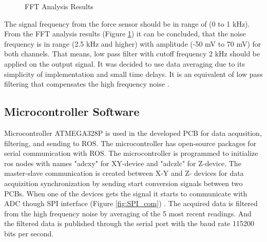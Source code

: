 \begin{figure}[h]%
\centering
{}%
\qquad
{}%
\caption{FFT Analysis Results}
\label{fig:FFT_res}
\end{figure}
	
	The signal frequency from the force sensor should be in range of (0 to 1 kHz). From the FFT analysis results (Figure \ref{fig:FFT_res}) it can be concluded, that the noise frequency is in range (2.5 kHz and higher) with amplitude (-50 mV to 70 mV) for both channels. That means, low pass filter with cutoff frequency 2 kHz should be applied on the output signal. It was decided to use data averaging due to its simplicity of implementation and small time delays. It is an equivalent of low pass filtering that compensates the high frequency noise \cite{filtering_mov_ave}.

	\subsection{Microcontroller Software}
	\label{sec:MicrSoft}
	Microcontroller ATMEGA328P is used in the developed PCB for data acqusition, filtering, and sending to ROS. The microcontroller has open-source packages for serial communication with ROS. The microcontroller is programmed to initialize ros nodes with names "adc\textunderscore xy" for XY-device and "adc\textunderscore zlc" for Z-device. The master-slave communication is created between X-Y and Z- devices for data acquizition synchronization by sending start conversion signals between two PCBs. When one of the devices gets the signal it starts to communicate with ADC though SPI interface (Figure \ref{fig:SPI_com}) \cite{introduction_SPI}. The acquired data is filtered from the high frequency noise by averaging of the 5 most recent readings. And the filtered data is published through the serial port with the baud rate 115200 bits per second. 
	
